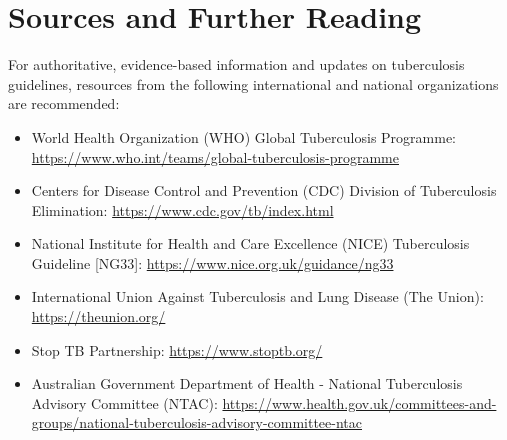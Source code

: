 \section*{Sources and Further Reading}
For authoritative, evidence-based information and updates on tuberculosis guidelines, resources from the following international and national organizations are recommended:
\begin{itemize}
    \item World Health Organization (WHO) Global Tuberculosis Programme: \url{https://www.who.int/teams/global-tuberculosis-programme}
    \item Centers for Disease Control and Prevention (CDC) Division of Tuberculosis Elimination: \url{https://www.cdc.gov/tb/index.html}
    \item National Institute for Health and Care Excellence (NICE) Tuberculosis Guideline [NG33]: \url{https://www.nice.org.uk/guidance/ng33}
    \item International Union Against Tuberculosis and Lung Disease (The Union): \url{https://theunion.org/}
    \item Stop TB Partnership: \url{https://www.stoptb.org/}
    \item Australian Government Department of Health - National Tuberculosis Advisory Committee (NTAC): \url{https://www.health.gov.uk/committees-and-groups/national-tuberculosis-advisory-committee-ntac}
\end{itemize}
